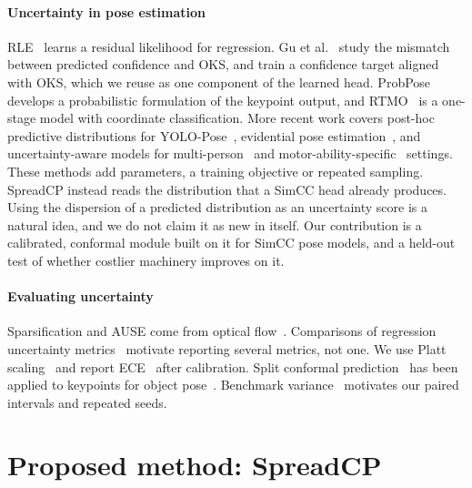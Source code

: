\documentclass[preprint,11pt]{elsarticle}
\newcommand{\method}{SpreadCP}
\begin{document}
\paragraph{Uncertainty in pose estimation} RLE~\cite{li2021rle} learns a residual likelihood for
regression. Gu et al.~\cite{gu2024calibration} study the mismatch between predicted confidence
and OKS, and train a confidence target aligned with OKS, which we reuse as one component of the
learned head. ProbPose~\cite{purkrabek2025probpose} develops a probabilistic formulation of the
keypoint output, and RTMO~\cite{lu2024rtmo} is a one-stage model with coordinate classification.
More recent work covers post-hoc predictive distributions for YOLO-Pose~\cite{klushyn2026yolopose},
evidential pose estimation~\cite{henriques2026evidential}, and uncertainty-aware models for
multi-person~\cite{huu2025contextual} and motor-ability-specific~\cite{wang2026motor} settings.
These methods add parameters, a training objective or repeated sampling. \method{} instead reads
the distribution that a SimCC head already produces. Using the dispersion of a predicted
distribution as an uncertainty score is a natural idea, and we do not claim it as new in itself. Our
contribution is a calibrated, conformal module built on it for SimCC pose models, and a held-out
test of whether costlier machinery improves on it.

\paragraph{Evaluating uncertainty} Sparsification and AUSE come from optical
flow~\cite{ilg2018uncertainty}. Comparisons of regression uncertainty
metrics~\cite{lind2024metrics,levi2022evaluating} motivate reporting several metrics, not one.
We use Platt scaling~\cite{platt1999probabilistic} and report ECE~\cite{guo2017calibration} after
calibration. Split conformal
prediction~\cite{angelopoulos2021gentle} has been applied to keypoints for object
pose~\cite{yang2023conformal}. Benchmark variance~\cite{bouthillier2021variance} motivates our
paired intervals and repeated seeds.

\section{Proposed method: \method{}}\label{sec:method}
\end{document}
